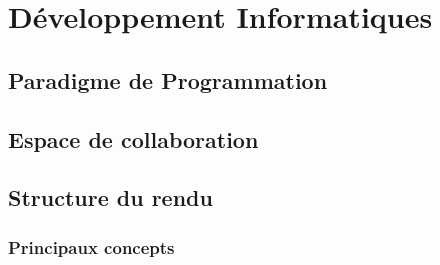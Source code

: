 \section{Développement Informatiques}

\subsection{Paradigme de Programmation}

\subsection{Espace de collaboration}

\subsection{Structure du rendu}

\subsubsection{Principaux concepts}


